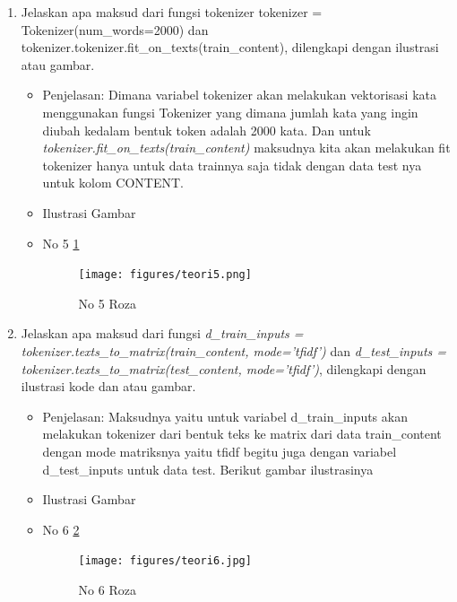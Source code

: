 \begin{enumerate}
\item Jelaskan apa maksud dari fungsi tokenizer {tokenizer = Tokenizer(num\_words=2000)} dan tokenizer.{tokenizer.fit\_on\_texts(train\_content)}, dilengkapi dengan ilustrasi atau gambar.
\begin{itemize}
\item Penjelasan: Dimana variabel tokenizer akan melakukan vektorisasi kata menggunakan fungsi Tokenizer yang dimana jumlah kata yang ingin diubah kedalam bentuk token adalah 2000 kata. Dan untuk \emph{tokenizer.fit\_on\_texts(train\_content)} maksudnya kita akan melakukan fit tokenizer hanya untuk data trainnya saja tidak dengan data test nya untuk kolom CONTENT. 
\par 
\par
\item Ilustrasi Gambar
\item No 5 \ref{teori5}
\begin{figure}[!hbtp]
\centering
\texttt{[image: figures/teori5.png]}
\caption{No 5 Roza}
\label{teori5}
\end{figure}
\par
\end{itemize}
\par
\par


\item Jelaskan apa maksud dari fungsi \emph{d\_train\_inputs = tokenizer.texts\_to\_matrix(train\_content, mode='tfidf')} dan \emph{d\_test\_inputs = tokenizer.texts\_to\_matrix(test\_content, mode='tfidf')}, dilengkapi dengan ilustrasi kode dan atau gambar.
\begin{itemize}
\item Penjelasan: Maksudnya yaitu untuk variabel d\_train\_inputs akan melakukan tokenizer dari bentuk teks ke matrix dari data train\_content dengan mode matriksnya yaitu tfidf begitu juga dengan variabel d\_test\_inputs untuk data test. Berikut gambar ilustrasinya
\par 
\par
\item Ilustrasi Gambar
\item No 6 \ref{teori6}
\begin{figure}[!hbtp]
\centering
\texttt{[image: figures/teori6.jpg]}
\caption{No 6 Roza}
\label{teori6}
\end{figure}
\par
\end{itemize}
\par
\par


\end{enumerate}
